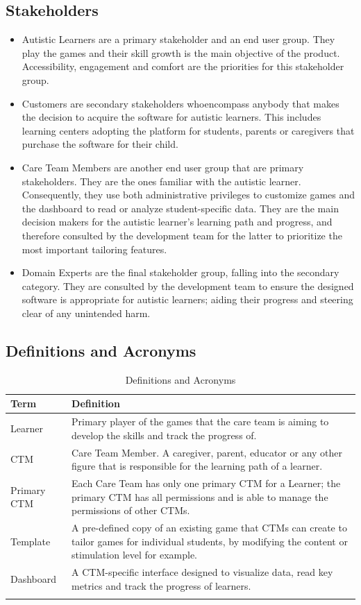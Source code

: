 \documentclass[12pt]{article}
\begin{document}
\subsection{Stakeholders}
\begin{itemize}
\item Autistic Learners are a primary stakeholder and an end user group. They play the games and their skill growth is the main objective of the product. Accessibility, engagement and comfort are the priorities for this stakeholder group.
\item Customers are secondary stakeholders whoencompass anybody that makes the decision to acquire the software for autistic learners. This includes learning centers adopting the platform for students, parents or caregivers that purchase the software for their child.
\item Care Team Members are another end user group that are primary stakeholders. They are the ones familiar with the autistic learner. Consequently, they use both administrative privileges to customize games and the dashboard to read or analyze student-specific data. They are the main decision makers for the autistic learner's learning path and progress, and therefore consulted by the development team for the latter to prioritize the most important tailoring features.
\item Domain Experts are the final stakeholder group, falling into the secondary category. They are consulted by the development team to ensure the designed software is appropriate for autistic learners; aiding their progress and steering clear of any unintended harm. 
\end{itemize}

\subsection{Definitions and Acronyms}

\begin{longtable}{p{} p{}}
\toprule
Term & Definition\\
\midrule
Learner & Primary player of the games that the care team is aiming to develop the skills and track the progress of.\\
CTM & Care Team Member. A caregiver, parent, educator or any other figure that is responsible for the learning path of a learner.\\
Primary CTM & Each Care Team has only one primary CTM for a Learner; the primary CTM has all permissions and is able to manage the permissions of other CTMs.\\
Template & A pre-defined copy of an existing game that CTMs can create to tailor games for individual students, by modifying the content or stimulation level for example.\\
Dashboard & A CTM-specific interface designed to visualize data, read key metrics and track the progress of learners.\\
\bottomrule
\caption{Definitions and Acronyms} \label{tab:DefinitionsAndAcronyms}
\end{longtable}
\end{document}
